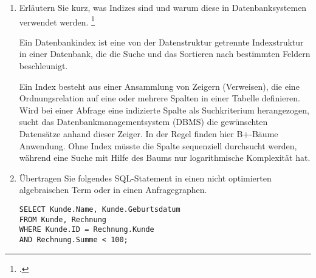 \documentclass{bschlangaul-aufgabe}
\begin{document}

\begin{enumerate}


\item Erläutern Sie kurz, was Indizes sind und warum diese in
Datenbanksystemen verwendet werden.
\footcite{examen:66116:2021:03}

\begin{bAntwort}
Ein Datenbankindex ist eine von der Datenstruktur getrennte
Indexstruktur in einer Datenbank, die die Suche und das Sortieren nach
bestimmten Feldern beschleunigt.

Ein Index besteht aus einer Ansammlung von Zeigern (Verweisen), die eine
Ordnungsrelation auf eine oder mehrere Spalten in einer Tabelle
definieren. Wird bei einer Abfrage eine indizierte Spalte als
Suchkriterium herangezogen, sucht das Datenbankmanagementsystem (DBMS)
die gewünschten Datensätze anhand dieser Zeiger. In der Regel finden
hier B+-Bäume Anwendung. Ohne Index müsste die Spalte sequenziell
durchsucht werden, während eine Suche mit Hilfe des Baums nur
logarithmische Komplexität hat.
\end{bAntwort}


\item Übertragen Sie folgendes SQL-Statement in einen nicht optimierten
algebraischen Term oder in einen Anfragegraphen.

\begin{verbatim}
SELECT Kunde.Name, Kunde.Geburtsdatum
FROM Kunde, Rechnung
WHERE Kunde.ID = Rechnung.Kunde
AND Rechnung.Summe < 100;
\end{verbatim}

\begin{bAntwort}
\begin{center}
\end{center}
\end{bAntwort}
\end{enumerate}
\end{document}
